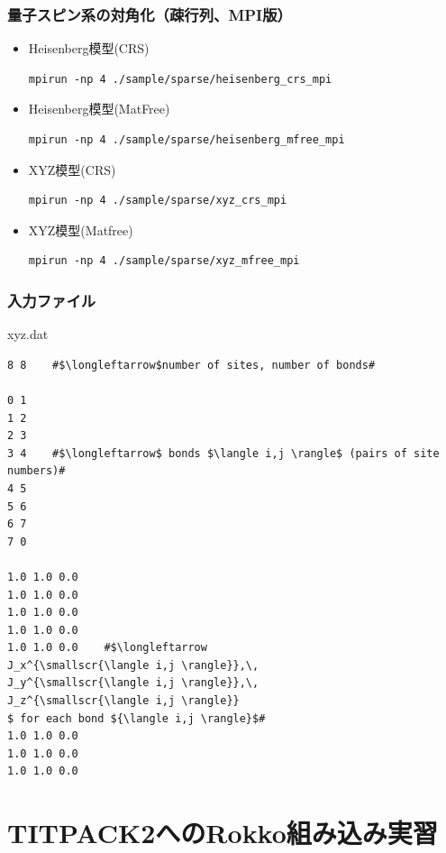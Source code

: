 \begin{frame}[c,fragile]
  \frametitle{量子スピン系の対角化（疎行列、MPI版）}
  \begin{itemize}
  \item Heisenberg模型(CRS) 
\begin{lstlisting}[style=shstyle]
mpirun -np 4 ./sample/sparse/heisenberg_crs_mpi
\end{lstlisting}
  \item Heisenberg模型(MatFree) 
\begin{lstlisting}[style=shstyle]
mpirun -np 4 ./sample/sparse/heisenberg_mfree_mpi
\end{lstlisting}
  \item XYZ模型(CRS) 
\begin{lstlisting}[style=shstyle]
mpirun -np 4 ./sample/sparse/xyz_crs_mpi
\end{lstlisting}
  \item XYZ模型(Matfree) 
\begin{lstlisting}[style=shstyle]
mpirun -np 4 ./sample/sparse/xyz_mfree_mpi
\end{lstlisting}
  \end{itemize}
\end{frame}

\lstset{escapechar=\#}

\begin{frame}[c,fragile]
  \frametitle{入力ファイル}
xyz.dat
\begin{lstlisting}[style=shstyle]
8 8    #$\longleftarrow$number of sites, number of bonds#

0 1
1 2
2 3
3 4    #$\longleftarrow$ bonds $\langle i,j \rangle$ (pairs of site numbers)#
4 5
5 6
6 7
7 0

1.0 1.0 0.0
1.0 1.0 0.0
1.0 1.0 0.0
1.0 1.0 0.0
1.0 1.0 0.0    #$\longleftarrow
J_x^{\smallscr{\langle i,j \rangle}},\, 
J_y^{\smallscr{\langle i,j \rangle}},\,
J_z^{\smallscr{\langle i,j \rangle}}
$ for each bond ${\langle i,j \rangle}$#
1.0 1.0 0.0
1.0 1.0 0.0
1.0 1.0 0.0
\end{lstlisting}
\end{frame}

\section{TITPACK2へのRokko組み込み実習}

